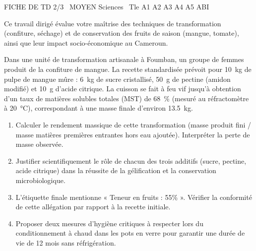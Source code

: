 \documentclass[11pt]{article}
\begin{document}
\begin{tcolorbox}[enhanced,colback=popink,colframe=popink,arc=10pt,boxrule=0pt,left=12pt,right=12pt,top=9pt,bottom=9pt]
{\color{white}\popxbold\small FICHE DE TD 2/3 \textbullet\ MOYEN \hfill Sciences \textbullet\ Tle A1 A2 A3 A4 A5 ABI\par}
\end{tcolorbox}
\vspace{4pt}
\noindent Ce travail dirigé évalue votre maîtrise des techniques de transformation (confiture, séchage) et de conservation des fruits de saison (mangue, tomate), ainsi que leur impact socio-économique au Cameroun.

\begin{exercice}
\label{exo:confiture}
Dans une unité de transformation artisanale à Foumban, un groupe de femmes produit de la confiture de mangue. La recette standardisée prévoit pour \SI{10}{kg} de pulpe de mangue mûre : \SI{6}{kg} de sucre cristallisé, \SI{50}{g} de pectine (amidon modifié) et \SI{10}{g} d'acide citrique. La cuisson se fait à feu vif jusqu'à obtention d'un taux de matières solubles totales (MST) de \SI{68}{\%} (mesuré au réfractomètre à \SI{20}{\celsius}), correspondant à une masse finale d'environ \SI{13,5}{kg}.
\begin{enumerate}
    \item Calculer le rendement massique de cette transformation (masse produit fini / masse matières premières entrantes hors eau ajoutée). Interpréter la perte de masse observée.
    \item Justifier scientifiquement le rôle de chacun des trois additifs (sucre, pectine, acide citrique) dans la réussite de la gélification et la conservation microbiologique.
    \item L'étiquette finale mentionne « Teneur en fruits : 55\% ». Vérifier la conformité de cette allégation par rapport à la recette initiale.
    \item Proposer deux mesures d'hygiène critiques à respecter lors du conditionnement à chaud dans les pots en verre pour garantir une durée de vie de 12 mois sans réfrigération.
\end{enumerate}
\end{exercice}
\end{document}
